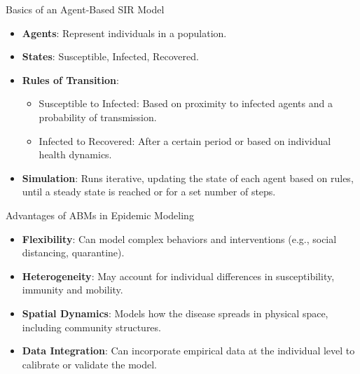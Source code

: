 \begin{frame}{Basics of an Agent-Based SIR Model}
\begin{itemize}
    \item \textbf{Agents}: Represent individuals in a population.
    \item \textbf{States}: Susceptible, Infected, Recovered.
    \pause
    \item \textbf{Rules of Transition}:
    \begin{itemize}
        \item Susceptible to Infected: Based on proximity to infected agents and a probability of transmission.
        \item Infected to Recovered: After a certain period or based on individual health dynamics.
    \end{itemize}
        \pause
    \item \textbf{Simulation}: Runs iterative, updating the state of each agent based on rules, until a steady state is reached or for a set number of steps.
\end{itemize}
\end{frame}


\begin{frame}{Advantages of ABMs in Epidemic Modeling}
\begin{itemize}
    \item \textbf{Flexibility}: Can model complex behaviors and interventions (e.g., social distancing, quarantine).
        \pause
    \item \textbf{Heterogeneity}: May account for individual differences in susceptibility, immunity and mobility.
        \pause
    \item \textbf{Spatial Dynamics}: Models how the disease spreads in physical space, including community structures.
        \pause
    \item \textbf{Data Integration}: Can incorporate empirical data at the individual level to calibrate or validate the model.
\end{itemize}
\end{frame}